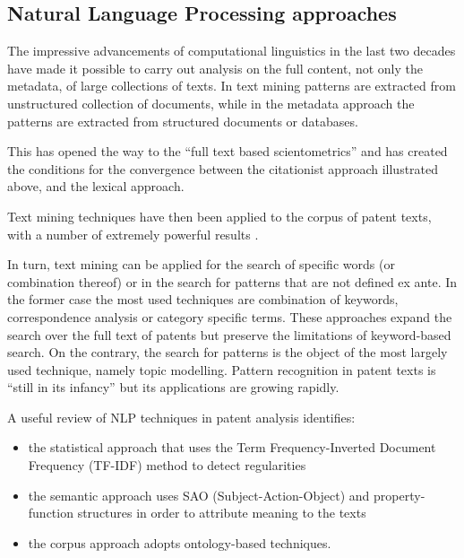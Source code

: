 \documentclass[b5paper,]{book}
\providecommand{\tightlist}{%
  \setlength{\itemsep}{0pt}\setlength{\parskip}{0pt}}
\theoremstyle{definition}
\theoremstyle{definition}
\theoremstyle{definition}
\theoremstyle{remark}
\begin{document}
\subsection{Natural Language Processing
approaches}\label{natural-language-processing-approaches}

The impressive advancements of computational linguistics in the last two
decades have made it possible to carry out analysis on the full content,
not only the metadata, of large collections of texts. In text mining
patterns are extracted from unstructured collection of documents, while
in the metadata approach the patterns are extracted from structured
documents or databases.

This has opened the way to the ``full text based scientometrics''
\citep{boyack2013improving} and has created the conditions for the
convergence between the citationist approach illustrated above, and the
lexical approach.

Text mining techniques have then been applied to the corpus of patent
texts, with a number of extremely powerful results
\citep{tseng2007text, joung2017monitoring, kreuchauff2017patent, ozcan2017patent, yoon2012detecting}.

In turn, text mining can be applied for the search of specific words (or
combination thereof) or in the search for patterns that are not defined
ex ante. In the former case the most used techniques are combination of
keywords, correspondence analysis or category specific terms. These
approaches expand the search over the full text of patents but preserve
the limitations of keyword-based search. On the contrary, the search for
patterns is the object of the most largely used technique, namely topic
modelling. Pattern recognition in patent texts is ``still in its
infancy'' \citep{madani2016evolution} but its applications are growing
rapidly.

A useful review of NLP techniques in patent analysis
\citep{madani2016evolution} identifies:

\begin{itemize}
\tightlist
\item
  the statistical approach that uses the Term Frequency-Inverted
  Document Frequency (TF-IDF) method to detect regularities
\item
  the semantic approach uses SAO (Subject-Action-Object) and
  property-function structures in order to attribute meaning to the
  texts
\item
  the corpus approach adopts ontology-based techniques.
\end{itemize}
\end{document}
